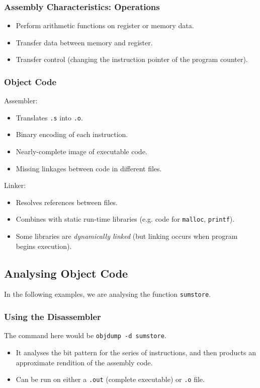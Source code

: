 \documentclass[class=article, crop=false]{standalone}
\begin{document}
  \subsubsection{Assembly Characteristics: Operations}
  \begin{itemize}
    \item Perform arithmetic functions on register or memory data.
    \item Transfer data between memory and register.
    \item Transfer control (changing the instruction pointer of the program counter).
  \end{itemize}
  \subsubsection{Object Code}
  Assembler:
  \begin{itemize}
    \item Translates \texttt{.s} into \texttt{.o}.
    \item Binary encoding of each instruction.
    \item Nearly-complete image of executable code.
    \item Missing linkages between code in different files.
  \end{itemize}
  Linker:
  \begin{itemize}
    \item Resolves references between files.
    \item Combines with static run-time libraries (e.g. code for \texttt{malloc}, \texttt{printf}).
    \item Some libraries are \emph{dynamically linked} (but linking occurs when program begins execution).
  \end{itemize}
  \subsection{Analysing Object Code}
  In the following examples, we are analysing the function \texttt{sumstore}.
  \subsubsection{Using the Disassembler}
  The command here would be \texttt{objdump -d sumstore}.
  \begin{itemize}
    \item It analyses the bit pattern for the series of instructions, and then products an approximate rendition of the assembly code. 
    \item Can be run on either a \texttt{.out} (complete executable) or \texttt{.o} file. 
  \end{itemize}
\end{document}

